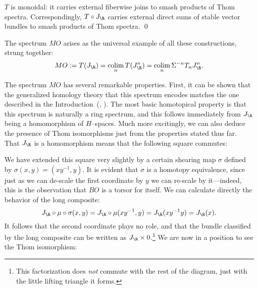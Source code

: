 \begin{lemma}\label{ThomSpacesAreMonoidal}
\(T\) is monoidal: it carries external fiberwise joins to smash products of Thom spectra.  Correspondingly, \(T \circ J_{\R}\) carries external direct sums of stable vector bundles to smash products of Thom spectra. \qed
\end{lemma}

\begin{definition}\label{DefnOfMO}
The spectrum \(MO\) arises as the universal example of all these constructions, strung together:
\[MO := T(J_{\R}) = \colim_n T(J_{\R}^n) = \colim_n \Susp^{-n} T_n J_{\R}^n.\]
\end{definition}

The spectrum \(MO\) has several remarkable properties.  First, it can be shown that the generalized homology theory that this spectrum encodes matches the one described in the Introduction~(\cite[Theorem 12.30]{Switzer}, \cite[Theorem 7.27]{Rudyak}).  The most basic homotopical property is that this spectrum is naturally a ring spectrum, and this follows immediately from \(J_{\R}\) being a homomorphism of \(H\)--spaces.  Much more excitingly, we can also deduce the presence of Thom isomorphisms just from the properties stated thus far.  That \(J_{\R}\) is a homomorphism means that the following square commutes:
\begin{center}
\end{center}
We have extended this square very slightly by a certain shearing map \(\sigma\) defined by \(\sigma(x, y) = (xy^{-1}, y)\).  It is evident that \(\sigma\) is a homotopy equivalence, since just as we can de-scale the first coordinate by \(y\) we can re-scale by it---indeed, this is the observation that \(BO\) is a torsor for itself.  We can calculate directly the behavior of the long composite: \[J_{\R} \circ \mu \circ \sigma(x, y) = J_{\R} \circ \mu(xy^{-1}, y) = J_{\R}(xy^{-1}y) = J_{\R}(x).\]  It follows that the second coordinate plays no role, and that the bundle classified by the long composite can be written as \(J_{\R} \times 0\).\footnote{This factorization does \emph{not} commute with the rest of the diagram, just with the little lifting triangle it forms.}  We are now in a position to see the Thom isomorphism:
